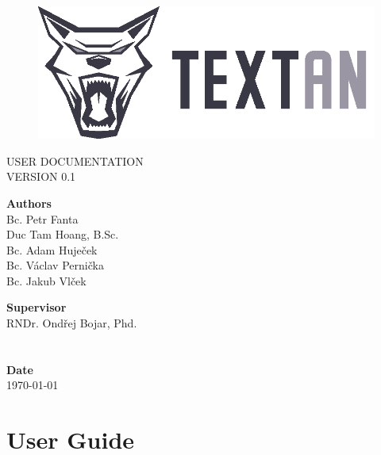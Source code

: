 \documentclass[12pt,a4paper]{report}
\begin{document}
\begin{titlepage}
\BgThispage
{}

\begin{figure}
 \includegraphics{../Logos/TEXTAN_logo_grey_B}
\end{figure}
\noindent
\textcolor{TextanRed}{\chapterfont\fontsize{48pt}{1pt}\selectfont\MakeUppercase{User documentation}}\\[15pt]
\textcolor{TextanDarkRed}{\sectionfont\LARGE\MakeUppercase{Version 0.1}}

\vfill
\noindent
\begin{minipage}[b]{.65\textwidth}
\textbf{Authors}\\
Bc. Petr Fanta\\
Duc Tam Hoang, B.Sc.\\
Bc. Adam Huječek\\
Bc. Václav Pernička\\
Bc. Jakub Vlček
\end{minipage}%
\begin{minipage}[b]{.35\textwidth}
\textbf{Supervisor} \\
RNDr. Ondřej Bojar, Phd.\\
\\
\\
\textbf{Date}\\
\today
\end{minipage}

\end{titlepage}
\restoregeometry

\tableofcontents


\chapter{User Guide}
\end{document}

